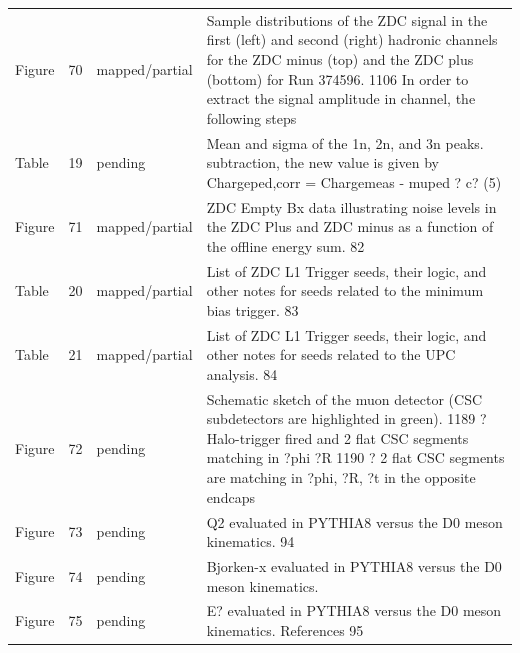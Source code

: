 \documentclass[11pt]{article}
\begin{document}
\begin{longtable}{lll p{}}
Figure & 70 & mapped/partial & Sample distributions of the ZDC signal in the first (left) and second (right) hadronic channels for the ZDC minus (top) and the ZDC plus (bottom) for Run 374596. 1106 In order to extract the signal amplitude in channel, the following steps  \\
Table & 19 & pending & Mean and sigma of the 1n, 2n, and 3n peaks. subtraction, the new value is given by Chargeped,corr = Chargemeas - muped ? c? (5) \\
Figure & 71 & mapped/partial & ZDC Empty Bx data illustrating noise levels in the ZDC Plus and ZDC minus as a function of the offline energy sum. 82 \\
Table & 20 & mapped/partial & List of ZDC L1 Trigger seeds, their logic, and other notes for seeds related to the minimum bias trigger. 83 \\
Table & 21 & mapped/partial & List of ZDC L1 Trigger seeds, their logic, and other notes for seeds related to the UPC analysis. 84 \\
Figure & 72 & pending & Schematic sketch of the muon detector (CSC subdetectors are highlighted in green). 1189 ? Halo-trigger fired and 2 flat CSC segments matching in ?phi ?R 1190 ? 2 flat CSC segments are matching in ?phi, ?R, ?t in the opposite endcaps \\
Figure & 73 & pending & Q2 evaluated in PYTHIA8 versus the D0 meson kinematics. 94 \\
Figure & 74 & pending & Bjorken-x evaluated in PYTHIA8 versus the D0 meson kinematics. \\
Figure & 75 & pending & E? evaluated in PYTHIA8 versus the D0 meson kinematics. References 95 \\
\bottomrule
\end{longtable}
\end{document}
